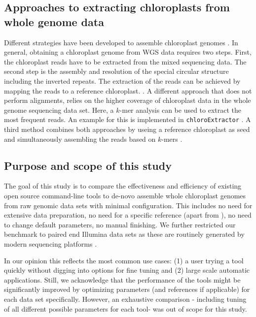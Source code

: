 \documentclass{bmcart}
\newcounter{todocounter}
\newcommand{\ak}[1]
{\stepcounter{todocounter}
 \todo[color=green!40,author=Arthur]{\thetodocounter: #1}
 }
\newcommand{\formatprogramnames}[1]{\texttt{#1}}
\newcommand{\ce}{\formatprogramnames{chloroExtractor}}
\begin{document}
\subsection*{Approaches to extracting chloroplasts from whole genome data}

Different strategies have been developed to assemble chloroplast genomes \cite{twyford_strategies_2017}.
In general, obtaining a chloroplast genome from WGS data requires two steps. First, the chloroplast reads have to be extracted from the mixed sequencing data. 
The second step is the assembly and resolution of the special circular structure including the inverted repeats.
The extraction of the reads can be achieved by mapping the reads to a reference chloroplast. \cite{Vinga2012}.
A different approach that does not perform alignments, relies on the higher coverage of chloroplast data in the whole genome sequencing data set\cite{Chan2013}.
Here, a $k$-mer analysis can be used to extract the most frequent reads. An example for this is implemented in \ce{} \cite{j_ankenbrand_chloroextractor:_2018}. 
A third method combines both approaches by useing a reference chloroplast as seed and simultaneously assembling the reads based on $k$-mers \cite{dierckxsens_novoplasty:_2017}.


\subsection*{Purpose and scope of this study}
The goal of this study is to compare the effectiveness and efficiency of existing open source command-line tools to de-novo assemble whole chloroplast genomes from raw genomic data sets with minimal configuration. 
This includes no need for extensive data preparation, no need for a specific reference (apart from ), no need to change default parameters, no manual finishing.
We further restricted our benchmark to paired end Illumina data sets as these are routinely generated by modern sequencing platforms \cite{Goodwin2016}. 

In our opinion this reflects the most common use cases: (1) a user trying a tool quickly without digging into options for fine tuning and (2) large scale automatic applications.
Still, we acknowledge that the performance of the tools might be significantly improved by optimizing parameters (and references if applicable) for each data set specifically.
However, an exhaustive comparison - including tuning of all different possible parameters for each tool- was out of scope for this study. 
\end{document}
